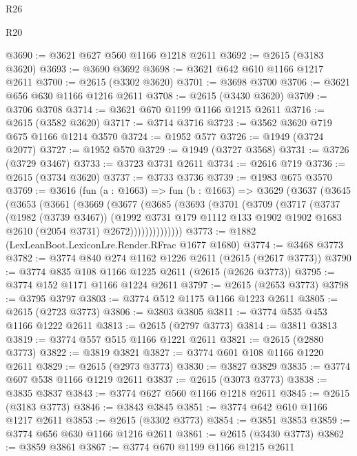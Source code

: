 \begin{lexlean}{R26}
\begin{lexlean}{R20}
\begin{coremodule}
{{{{{{{{{{{{{{{{{{{{{{{{{{{{{{{{{{{{{{{{{{{{{{{{{{{{{{{{{{{{{{{@3690 := @3621 @627 @560 @1166 @1218 @2611
@3692 := @2615 (@3183 @3620)
@3693 := @3690 @3692
@3698 := @3621 @642 @610 @1166 @1217 @2611
@3700 := @2615 (@3302 @3620)
@3701 := @3698 @3700
@3706 := @3621 @656 @630 @1166 @1216 @2611
@3708 := @2615 (@3430 @3620)
@3709 := @3706 @3708
@3714 := @3621 @670 @1199 @1166 @1215 @2611
@3716 := @2615 (@3582 @3620)
@3717 := @3714 @3716
@3723 := @3562 @3620 @719 @675 @1166 @1214 @3570
@3724 := @1952 @577
@3726 := @1949 (@3724 @2077)
@3727 := @1952 @570
@3729 := @1949 (@3727 @3568)
@3731 := @3726 (@3729 @3467)
@3733 := @3723 @3731 @2611
@3734 := @2616 @719
@3736 := @2615 (@3734 @3620)
@3737 := @3733 @3736
@3739 := @1983 @675 @3570
@3769 := @3616
    (fun (a : @1663) =>
    fun (b : @1663) =>
    @3629
      (@3637
        (@3645
          (@3653
            (@3661
              (@3669
                (@3677
                  (@3685
                    (@3693
                      (@3701
                        (@3709
                          (@3717
                            (@3737
                              (@1982 (@3739 @3467))
                              (@1992
                                @3731
                                @179
                                @1112
                                @133
                                @1902
                                @1902
                                @1683
                                @2610
                                (@2054 @3731)
                                @2672))))))))))))))
@3773 := @1882 (LexLeanBoot.LexiconLre.Render.RFrac @1677 @1680)
@3774 := @3468 @3773
@3782 := @3774 @840 @274 @1162 @1226 @2611 (@2615 (@2617 @3773))
@3790 := @3774 @835 @108 @1166 @1225 @2611 (@2615 (@2626 @3773))
@3795 := @3774 @152 @1171 @1166 @1224 @2611
@3797 := @2615 (@2653 @3773)
@3798 := @3795 @3797
@3803 := @3774 @512 @1175 @1166 @1223 @2611
@3805 := @2615 (@2723 @3773)
@3806 := @3803 @3805
@3811 := @3774 @535 @453 @1166 @1222 @2611
@3813 := @2615 (@2797 @3773)
@3814 := @3811 @3813
@3819 := @3774 @557 @515 @1166 @1221 @2611
@3821 := @2615 (@2880 @3773)
@3822 := @3819 @3821
@3827 := @3774 @601 @108 @1166 @1220 @2611
@3829 := @2615 (@2973 @3773)
@3830 := @3827 @3829
@3835 := @3774 @607 @538 @1166 @1219 @2611
@3837 := @2615 (@3073 @3773)
@3838 := @3835 @3837
@3843 := @3774 @627 @560 @1166 @1218 @2611
@3845 := @2615 (@3183 @3773)
@3846 := @3843 @3845
@3851 := @3774 @642 @610 @1166 @1217 @2611
@3853 := @2615 (@3302 @3773)
@3854 := @3851 @3853
@3859 := @3774 @656 @630 @1166 @1216 @2611
@3861 := @2615 (@3430 @3773)
@3862 := @3859 @3861
@3867 := @3774 @670 @1199 @1166 @1215 @2611
}}}}}}}}}}}}}}}}}}}}}}}}}}}}}}}}}}}}}}}}}}}}}}}}}}}}}}}}}}}}}}}
\end{coremodule}
\end{lexlean}
\end{lexlean}
